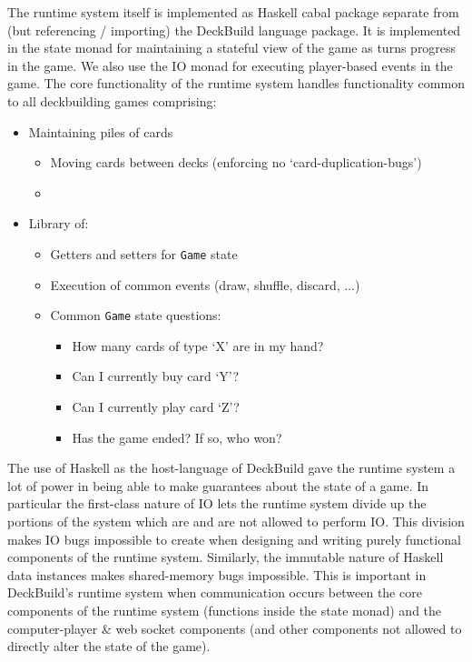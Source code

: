 The runtime system itself is implemented as Haskell cabal package separate
from (but referencing / importing) the DeckBuild language package. It is
implemented in the state monad for maintaining a stateful view of the game
as turns progress in the game. We also use the IO monad for executing
player-based events in the game. The core functionality of the runtime system
handles functionality common to all deckbuilding games comprising:

\begin{itemize}
\item Maintaining piles of cards
  \begin{itemize}
  \item Moving cards between decks (enforcing no `card-duplication-bugs')
  \item 
  \end{itemize}
\item Library of:
  \begin{itemize}
  \item Getters and setters for \texttt{Game} state
  \item Execution of common events (draw, shuffle, discard, ...)
  \item Common \texttt{Game} state questions:
    \begin{itemize}
    \item How many cards of type `X' are in my hand?
    \item Can I currently buy card `Y'?
    \item Can I currently play card `Z'?
    \item Has the game ended? If so, who won?
    \end{itemize}
  \end{itemize}
\end{itemize}

The use of Haskell as the host-language of DeckBuild gave the runtime system
a lot of power in being able to make guarantees about the state of a game.
In particular the first-class nature of IO lets the runtime system divide
up the portions of the system which are and are not allowed to perform IO.
This division makes IO bugs impossible to create when designing and writing
purely functional components of the runtime system. Similarly, the immutable
nature of Haskell data instances makes shared-memory bugs impossible. This is
important in DeckBuild's runtime system when communication occurs between the
core components of the runtime system (functions inside the state monad)
and the computer-player \& web socket components (and other components not
allowed to directly alter the state of the game).

